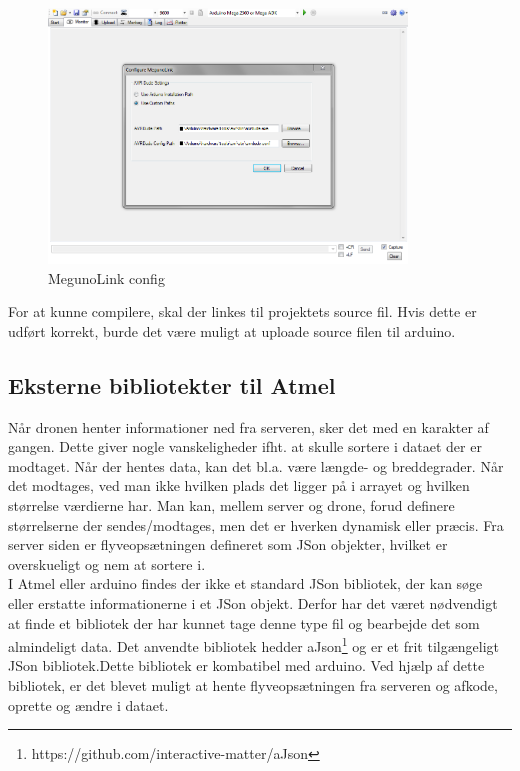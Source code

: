 \begin{figure}[H]
	\centering
	\includegraphics[width=0.85\textwidth]{Billeder/implementation/megunolink_config.png}
	\vspace{-.5cm}
	\caption{MegunoLink config}
	\label{fig:meglinkconf}
\end{figure}

For at kunne compilere, skal der linkes til projektets source fil. Hvis dette er udført korrekt, burde det være muligt at uploade source filen til arduino.

\subsection{Eksterne bibliotekter til Atmel}

Når dronen henter informationer ned fra serveren, sker det med en karakter af gangen. Dette giver nogle vanskeligheder ifht. at skulle sortere i dataet der er modtaget. Når der hentes data, kan det bl.a. være længde- og breddegrader. Når det modtages, ved man ikke hvilken plads det ligger på i arrayet og hvilken størrelse værdierne har. Man kan, mellem server og drone, forud definere størrelserne der sendes/modtages, men det er hverken dynamisk eller præcis. Fra server siden er flyveopsætningen defineret som JSon objekter, hvilket er overskueligt og nem at sortere i. \\
I Atmel eller arduino findes der ikke et standard JSon bibliotek, der kan søge eller erstatte informationerne i et JSon objekt. Derfor har det været nødvendigt at finde et bibliotek der har kunnet tage denne type fil og bearbejde det som almindeligt data. Det anvendte bibliotek hedder aJson\footnote{https://github.com/interactive-matter/aJson} og er et frit tilgængeligt JSon bibliotek.Dette bibliotek er kombatibel med arduino. Ved hjælp af dette bibliotek, er det blevet muligt at hente flyveopsætningen fra serveren og afkode, oprette og ændre i dataet.